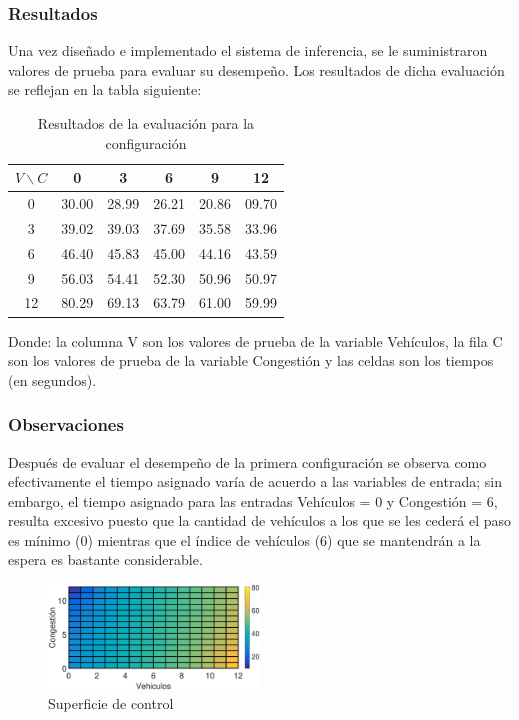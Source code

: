 \newpage
\subsubsection{Resultados}


Una vez diseñado e implementado el sistema de inferencia, se le suministraron valores de prueba para evaluar su desempeño. Los resultados de dicha evaluación se reflejan en la tabla siguiente:

\begin{table}[H]
	\centering
	\begin{tabular}{cccccc} \toprule
		$V \backslash C$ &  0 & 3 & 6 & 9 & 12 \\ \midrule
		0 & 30.00 & 28.99 & 26.21 & 20.86 & 09.70 \\
		3 & 39.02 & 39.03 & 37.69 & 35.58 & 33.96 \\
		6 & 46.40 & 45.83 & 45.00 & 44.16 & 43.59 \\
		9 & 56.03 & 54.41 & 52.30 & 50.96 & 50.97 \\
		12& 80.29 & 69.13 & 63.79 & 61.00 & 59.99 \\
	\end{tabular}
	\caption{Resultados de la evaluación para la configuración}
\end{table}
Donde: la columna V son los valores de prueba de la variable Vehículos, la fila C son los valores de  prueba de la variable Congestión y las celdas son los tiempos (en segundos).




\subsubsection{Observaciones}
\begin{multicols}{2}

Después de evaluar el desempeño de la primera configuración se observa como efectivamente el tiempo asignado varía de acuerdo a las variables de entrada; sin embargo, el tiempo asignado para las entradas Vehículos = 0 y Congestión = 6, resulta excesivo puesto que la cantidad de vehículos a los que se les cederá el paso es mínimo (0) mientras que el índice de vehículos (6) que se mantendrán a la espera es bastante considerable.

\begin{figure}[H]
	\includegraphics[width=0.5\textwidth]{Surfaces/Surface2D_A.eps}
	\caption{Superficie de control}
\end{figure}

\end{multicols}

